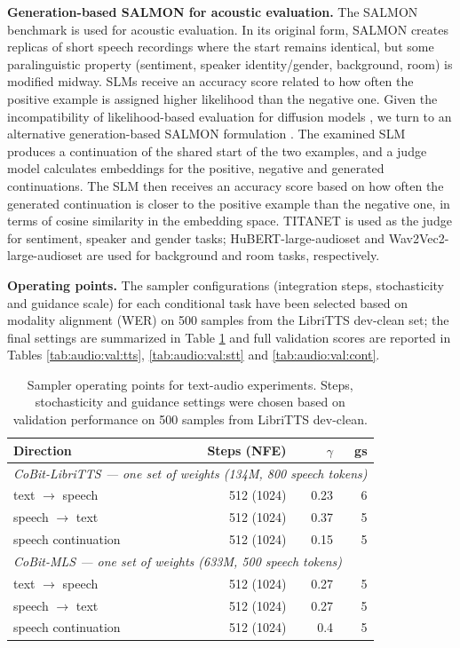 \textbf{Generation-based SALMON for acoustic evaluation.} The SALMON benchmark is used for acoustic evaluation. In its original form, SALMON creates replicas of short speech recordings where the start remains identical, but some paralinguistic property (sentiment, speaker identity/gender, background, room) is modified midway. SLMs receive an accuracy score related to how often the positive example is assigned higher likelihood than the negative one. Given the incompatibility of likelihood-based evaluation for diffusion models \citep{audio:diffusion-likelihood}, we turn to an alternative generation-based  SALMON formulation \citep{audio:gen-salmon}. The examined SLM produces a continuation of the shared start of the two examples, and a judge model calculates embeddings for the positive, negative and generated continuations. The SLM then receives an accuracy score based on how often the generated continuation is closer to the positive example than the negative one, in terms of cosine similarity in the embedding space. TITANET \citep{audio:titanet} is used as the judge for sentiment, speaker and gender tasks; HuBERT-large-audioset and Wav2Vec2-large-audioset \citep{audio:ARCH} are used for background and room tasks, respectively. 

\textbf{Operating points.} The sampler configurations (integration steps, stochasticity and guidance scale) for each conditional task have been selected based on modality alignment (WER) on 500 samples from the LibriTTS dev-clean set; the final settings are summarized in Table \ref{tab:audio:operating-points} and full validation scores are reported in Tables \ref{tab:audio:val:tts}, \ref{tab:audio:val:stt} and \ref{tab:audio:val:cont}.

\begin{table}[t]
\centering
\small
\setlength{\tabcolsep}{4.5pt}
\begin{tabular}{lrrr}
\toprule
\textbf{Direction} & Steps (NFE) & $\gamma$ & gs \\
\midrule
\multicolumn{4}{l}{\emph{CoBit-LibriTTS --- one set of weights (134M, 800 speech tokens)}}\\
text $\rightarrow$ speech & 512 (1024) & 0.23 & 6 \\
speech $\rightarrow$ text & 512 (1024) & 0.37 & 5 \\
speech continuation & 512 (1024) & 0.15 & 5 \\
\midrule
\multicolumn{4}{l}{\emph{CoBit-MLS --- one set of weights (633M, 500 speech tokens)}}\\
text $\rightarrow$ speech & 512 (1024) & 0.27 & 5 \\
speech $\rightarrow$ text & 512 (1024) & 0.27 & 5 \\
speech continuation & 512 (1024) & 0.4 & 5 \\
\bottomrule
\end{tabular}
\caption{Sampler operating points for text-audio experiments. Steps, stochasticity and guidance settings were chosen based on validation performance on 500 samples from LibriTTS dev-clean.}
\label{tab:audio:operating-points}
\end{table}

